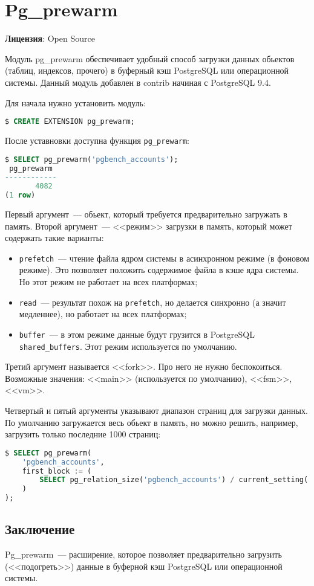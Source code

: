 \section{Pg\_prewarm}
\textbf{Лицензия}: Open Source

Модуль pg\_prewarm обеспечивает удобный способ загрузки данных обьектов (таблиц, индексов, прочего) в буферный кэш PostgreSQL или операционной системы. Данный модуль добавлен в contrib начиная с PostgreSQL 9.4.

Для начала нужно установить модуль:

\begin{lstlisting}[language=SQL,label=lst:pgprewarm1]
$ CREATE EXTENSION pg_prewarm;
\end{lstlisting}

После уставновки доступна функция \lstinline!pg_prewarm!:

\begin{lstlisting}[language=SQL,label=lst:pgprewarm2]
$ SELECT pg_prewarm('pgbench_accounts');
 pg_prewarm
------------
       4082
(1 row)
\end{lstlisting}

Первый аргумент~--- обьект, который требуется предварительно загружать в память. Второй аргумент~--- <<режим>> загрузки в память, который может содержать такие варианты:

\begin{itemize}
  \item \lstinline!prefetch!~--- чтение файла ядром системы в асинхронном режиме (в фоновом режиме). Это позволяет положить содержимое файла в кэше ядра системы. Но этот режим не работает на всех платформах;
  \item \lstinline!read!~--- результат похож на \lstinline!prefetch!, но делается синхронно (а значит медленнее), но работает на всех платформах;
  \item \lstinline!buffer!~--- в этом режиме данные будут грузится в PostgreSQL \lstinline!shared_buffers!. Этот режим используется по умолчанию.
\end{itemize}

Третий аргумент называется <<fork>>. Про него не нужно беспокоиться. Возможные значения: <<main>> (используется по умолчанию), <<fsm>>, <<vm>>.

Четвертый и пятый аргументы указывают диапазон страниц для загрузки данных. По умолчанию загружается весь обьект в память, но можно решить, например, загрузить только последние 1000 страниц:

\begin{lstlisting}[language=SQL,label=lst:pgprewarm3]
$ SELECT pg_prewarm(
    'pgbench_accounts',
    first_block := (
        SELECT pg_relation_size('pgbench_accounts') / current_setting('block_size')::int4 - 1000
    )
);
\end{lstlisting}


\subsection{Заключение}

Pg\_prewarm~--- расширение, которое позволяет предварительно загрузить (<<подогреть>>) данные в буферной кэш PostgreSQL или операционной системы.